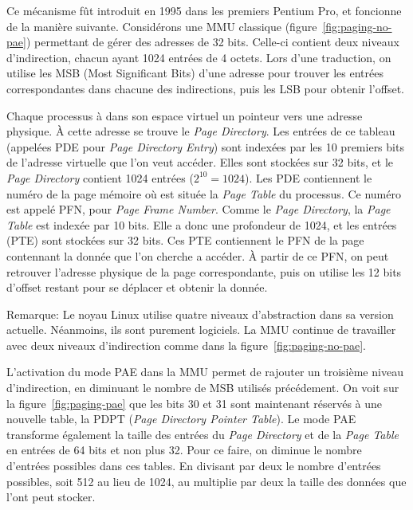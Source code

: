       Ce mécanisme fût introduit en 1995 dans les premiers Pentium Pro, et
      foncionne de la manière suivante. Considérons une MMU classique
      (figure~\ref{fig:paging-no-pae}) permettant de gérer des adresses de 32
      bits. Celle-ci contient deux niveaux d'indirection, chacun ayant 1024
      entrées de 4 octets. Lors d'une traduction, on utilise les MSB (Most
      Significant Bits) d'une adresse pour trouver les entrées correspondantes
      dans chacune des indirections, puis les LSB pour obtenir l'offset.

      Chaque processus à dans son espace virtuel un pointeur vers une adresse
      physique. À cette adresse se trouve le \textit{Page Directory}. Les
      entrées de ce tableau (appelées PDE pour \textit{Page Directory Entry})
      sont indexées par les 10 premiers bits de l'adresse virtuelle que l'on
      veut accéder. Elles sont stockées sur 32 bits, et le \textit{Page
        Directory} contient 1024 entrées ($2^{10} = 1024$). Les PDE contiennent
      le numéro de la page mémoire où est située la \textit{Page Table} du
      processus. Ce numéro est appelé PFN, pour \textit{Page Frame
        Number}. Comme le \textit{Page Directory}, la \textit{Page Table} est
      indexée par 10 bits. Elle a donc une profondeur de 1024, et les entrées
      (PTE) sont stockées sur 32 bits. Ces PTE contiennent le PFN de la page
      contennant la donnée que l'on cherche a accéder. À partir de ce PFN, on
      peut retrouver l'adresse physique de la page correspondante, puis on
      utilise les 12 bits d'offset restant pour se déplacer et obtenir la
      donnée.

      \begin{paragraph}{Remarque:}
        Le noyau Linux utilise quatre niveaux d'abstraction dans sa version
        actuelle. Néanmoins, ils sont purement logiciels. La MMU continue de
        travailler avec deux niveaux d'indirection comme dans la
        figure~\ref{fig:paging-no-pae}.\newline
      \end{paragraph}
      
      L'activation du mode PAE dans la MMU permet de rajouter un troisième
      niveau d'indirection, en diminuant le nombre de MSB utilisés
      précédement. On voit sur la figure~\ref{fig:paging-pae} que les bits 30 et
      31 sont maintenant réservés à une nouvelle table, la PDPT (\textit{Page
        Directory Pointer Table}). Le mode PAE transforme également la taille
      des entrées du \textit{Page Directory} et de la \textit{Page Table} en
      entrées de 64 bits et non plus 32. Pour ce faire, on diminue le nombre
      d'entrées possibles dans ces tables. En divisant par deux le nombre
      d'entrées possibles, soit 512 au lieu de 1024, au multiplie par deux la
      taille des données que l'ont peut stocker.

